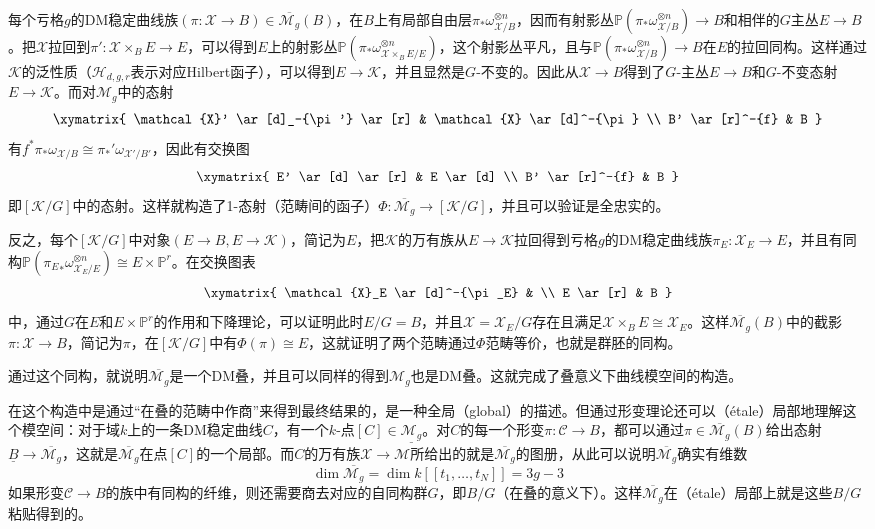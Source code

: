 每个亏格$ g $的DM稳定曲线族$ (\pi: \mathcal{X}\to B)\in \overline{\mathscr{M}_g}(B) $，在$ B $上有局部自由层$ \pi_*\omega_{\mathcal{X}/B}^{\otimes n} $，因而有射影丛$ \mathbb{P}(\pi_*\omega_{\mathcal{X}/B}^{\otimes n} )\to B $和相伴的$ G $主丛$ E\to B $。把$ \mathcal{X} $拉回到$ \pi':\mathcal{X}\times_BE \to E $，可以得到$ E $上的射影丛$ \mathbb{P}(\pi_*\omega_{\mathcal{X}\times_BE/E}^{\otimes n}) $，这个射影丛平凡，且与$ \mathbb{P}(\pi_*\omega_{\mathcal{X}/B}^{\otimes n })\to B $在$ E $的拉回同构。这样通过$ \mathcal{K} $的泛性质（$ \mathcal{H}_{d,g,r} $表示对应Hilbert函子），可以得到$ E\to \mathcal{K} $，并且显然是$ G $-不变的。因此从$ \mathcal{X}\to B $得到了$ G $-主丛$ E\to B $和$ G $-不变态射$ E\to \mathcal{K} $。而对$ {\mathscr{M}_g} $中的态射
$$ \xymatrix{
	\mathcal{X}' \ar[d]_-{\pi'} \ar[r] & \mathcal{X} \ar[d]^-{\pi} \\
	B' \ar[r]^-{f} & B
} $$
有$ f^*\pi_*\omega_{\mathcal{X}/B}\cong \pi_*'\omega_{\mathcal{X}'/B'} $，因此有交换图
$$ \xymatrix{
	E' \ar[d] \ar[r] & E \ar[d] \\
	B' \ar[r]^-{f} & B
} $$
即$ [\mathcal{K}/G] $中的态射。这样就构造了1-态射（范畴间的函子）$ \Phi:\overline{\mathscr{M}_g}\to [\mathcal{K}/G] $，并且可以验证是全忠实的。

反之，每个$ [\mathcal{K}/G] $中对象$ (E\to B,E\to \mathcal{K} ) $，简记为$ E $，把$ \mathcal{K} $的万有族从$ E\to \mathcal{K} $拉回得到亏格$ g $的DM稳定曲线族$ \pi_E:\mathcal{X}_E\to E $，并且有同构$ \mathbb{P}({\pi_E}_*\omega_{\mathcal{X}_E/E}^{\otimes n} ) \cong E\times \mathbb{P}^r$。在交换图表
$$ \xymatrix{
	\mathcal{X}_E \ar[d]^-{\pi_E} &  \\
	E \ar[r] & B
} $$
中，通过$ G $在$ E $和$ E\times \mathbb{P}^r $的作用和下降理论，可以证明此时$ E/G=B $，并且$ \mathcal{X}=\mathcal{X}_E/G $存在且满足$ \mathcal{X}\times_BE\cong \mathcal{X}_E $。这样$ \overline{\mathscr{M}_g}(B) $中的截影$ \pi:\mathcal{X}\to B $，简记为$ \pi $，在$ [\mathcal{K}/G] $中有$ \Phi(\pi) \cong E$，这就证明了两个范畴通过$ \Phi $范畴等价，也就是群胚的同构。

通过这个同构，就说明$ \overline{\mathscr{M}_g} $是一个DM叠，并且可以同样的得到$ \mathscr{M}_g $也是DM叠。这就完成了叠意义下曲线模空间的构造。

在这个构造中是通过“在叠的范畴中作商”来得到最终结果的，是一种全局（global）的描述。但通过形变理论还可以（\'etale）局部地理解这个模空间：对于域$ k $上的一条DM稳定曲线$ C $，有一个$ k $-点$ [C]\in \underline{\mathscr{M}_g} $。对$ C $的每一个形变$ \pi:\mathcal{C}\to B $，都可以通过$ \pi \in\overline{\mathscr{M}_g}(B)  $给出态射$ \underline{B}\to \overline{\mathscr{M}_g} $，这就是$ \overline{\mathscr{M}_g} $在点$ [C] $的一个局部。而$ C $的万有族$ \mathcal{X}\to \mathcal{M} $所给出的就是$ \overline{\mathscr{M}_g} $的图册，从此可以说明$ \overline{\mathscr{M}_g} $确实有维数
$$ \dim \overline{\mathscr{M}_g}=\dim k[[t_1,\ldots,t_N]]=3g-3 $$
如果形变$ \mathcal{C}\to B $的族中有同构的纤维，则还需要商去对应的自同构群$ G $，即$ B/G $（在叠的意义下）。这样$ \overline{\mathscr{M}_g} $在（\'etale）局部上就是这些$ B/G $粘贴得到的。

